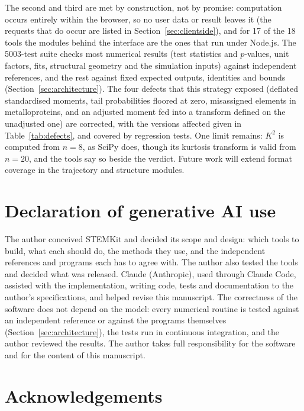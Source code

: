 \documentclass[11pt,a4paper]{article}
\begin{document}
The second and third are met by construction, not by promise: computation occurs
entirely within the browser, so no user data or result leaves it (the requests
that do occur are listed in Section~\ref{sec:clientside}), and for 17 of the 18
tools the modules behind the interface are the ones that run under Node.js. The
5003-test suite checks most numerical results (test statistics and $p$-values,
unit factors, fits, structural geometry and the simulation inputs) against
independent references, and the rest against fixed expected outputs, identities
and bounds (Section~\ref{sec:architecture}).
The four defects that this strategy exposed (deflated standardised moments, tail
probabilities floored at zero, misassigned elements in metalloproteins, and an
adjusted moment fed into a transform defined on the unadjusted one) are corrected, with the versions affected given in Table~\ref{tab:defects}, and covered by regression tests. One limit remains: $K^2$ is computed from $n = 8$, as SciPy does, though its kurtosis transform is valid from $n = 20$, and the tools say so beside the verdict. Future work will extend format
coverage in the trajectory and structure modules.

\section*{Declaration of generative AI use}

The author conceived STEMKit and decided its scope and design: which tools to
build, what each should do, the methods they use, and the independent
references and programs each has to agree with. The author also tested the
tools and decided what was released. Claude (Anthropic), used through Claude
Code, assisted with the implementation, writing code, tests and documentation
to the author's specifications, and helped revise this manuscript. The
correctness of the software does not depend on the model: every numerical
routine is tested against an independent reference or against the programs
themselves (Section~\ref{sec:architecture}), the tests run in continuous
integration, and the author reviewed the results. The author takes full
responsibility for the software and for the content of this manuscript.

\section*{Acknowledgements}
\end{document}

